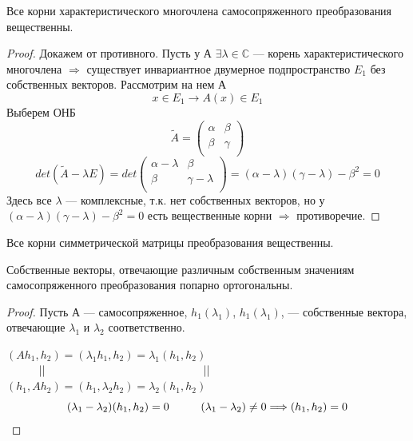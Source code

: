\begin{proposition}
    Все корни характеристического многочлена самосопряженного преобразования вещественны.
\end{proposition}
\begin{proof}
    Докажем от противного. Пусть у А $\exists \lambda \in \mathbb{C}$ --- корень характеристического многочлена $\Longrightarrow$ существует инвариантное двумерное подпространство $E_1$ без собственных векторов. Рассмотрим на нем А
    \[
    x \in E_1 \longrightarrow A(x) \in E_1
    \]
    Выберем ОНБ
    \[
    \widetilde{A} = \begin{pmatrix}
        \alpha & \beta \\
        \beta & \gamma \\
    \end{pmatrix}
    \]
    \[
    det (\widetilde{A} - \lambda E) = det \begin{pmatrix}
        \alpha - \lambda & \beta \\
        \beta & \gamma - \lambda \\
    \end{pmatrix} = (\alpha - \lambda)(\gamma - \lambda) - \beta^2 = 0
    \]
    Здесь все $\lambda$ --- комплексные, т.к. нет собственных векторов, но у $(\alpha - \lambda)(\gamma - \lambda) - \beta^2 = 0$ есть вещественные корни $\Longrightarrow$ противоречие.
\end{proof}

\begin{corollary}
    Все корни симметрической матрицы преобразования вещественны.
\end{corollary}

\begin{theorem}
    Собственные векторы, отвечающие различным собственным значениям самосопряженного преобразования попарно ортогональны.
\end{theorem}
\begin{proof}
    Пусть А --- самосопряженное, $h_1(\lambda_1)$, $h_1(\lambda_1)$, --- собственные вектора, отвечающие $\lambda_1$ и $\lambda_2$ соответственно.

    $(Ah_1, h_2) = (\lambda_1h_1, h_2) = \lambda_1(h_1, h_2)$\\
    $\tab||\tab\tab\tab\tab\tab||$\\
    $(h_1, Ah_2) = (h_1, \lambda_2h_2) = \lambda_2(h_1, h_2)$\\

    \[
    (\lambda_1 - \lambda_2)(h_1, h_2) = 0 \hspace*{1cm} (\lambda_1 - \lambda_2) \neq 0 \Longrightarrow (h_1, h_2) = 0
    \]
\end{proof}

